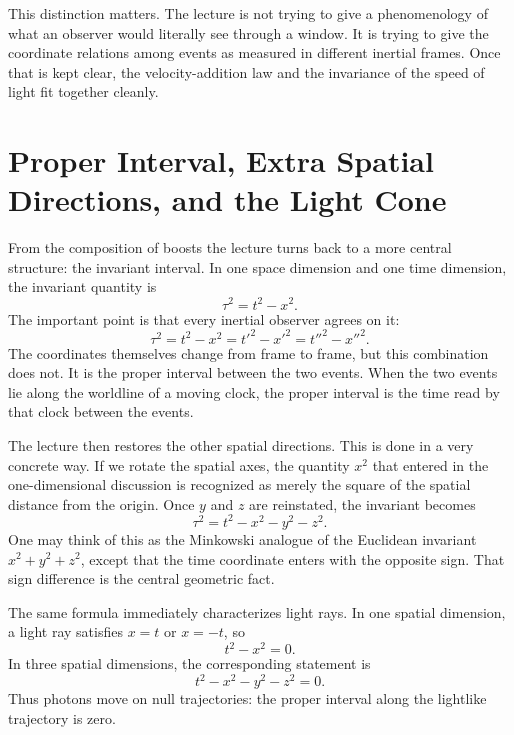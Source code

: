 This distinction matters. The lecture is not trying to give a phenomenology of what an observer would literally see through a window. It is trying to give the coordinate relations among events as measured in different inertial frames. Once that is kept clear, the velocity-addition law and the invariance of the speed of light fit together cleanly.

\section{Proper Interval, Extra Spatial Directions, and the Light Cone}

From the composition of boosts the lecture turns back to a more central structure: the invariant interval. In one space dimension and one time dimension, the invariant quantity is
\begin{equation}
\tau^2=t^2-x^2.
\end{equation}
The important point is that every inertial observer agrees on it:
\begin{equation}
\tau^2=t^2-x^2=t'^2-x'^2=t''^2-x''^2.
\end{equation}
The coordinates themselves change from frame to frame, but this combination does not. It is the proper interval between the two events. When the two events lie along the worldline of a moving clock, the proper interval is the time read by that clock between the events.

The lecture then restores the other spatial directions. This is done in a very concrete way. If we rotate the spatial axes, the quantity \(x^2\) that entered in the one-dimensional discussion is recognized as merely the square of the spatial distance from the origin. Once \(y\) and \(z\) are reinstated, the invariant becomes
\begin{equation}
\tau^2=t^2-x^2-y^2-z^2.
\end{equation}
One may think of this as the Minkowski analogue of the Euclidean invariant \(x^2+y^2+z^2\), except that the time coordinate enters with the opposite sign. That sign difference is the central geometric fact.

The same formula immediately characterizes light rays. In one spatial dimension, a light ray satisfies \(x=t\) or \(x=-t\), so
\begin{equation}
t^2-x^2=0.
\end{equation}
In three spatial dimensions, the corresponding statement is
\begin{equation}
t^2-x^2-y^2-z^2=0.
\end{equation}
Thus photons move on null trajectories: the proper interval along the lightlike trajectory is zero.

